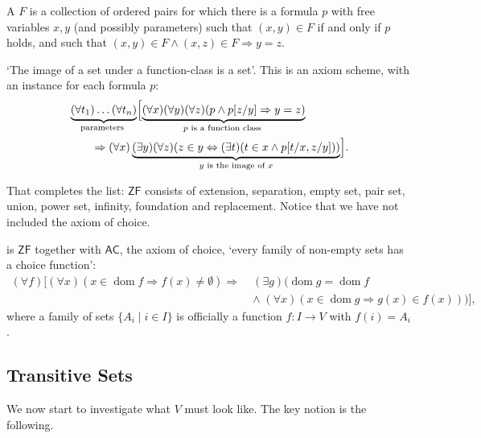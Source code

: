 \documentclass[a4paper]{scrartcl}
\newcommand{\dom}{\operatorname{dom}}
\newcommand{\ZF}{\mathsf{ZF}}
\newcommand{\ZFC}{\mathsf{ZFC}}
\newcommand{\AC}{\mathsf{AC}}
\begin{document}
\begin{definition}
  A  $F$ is a collection of ordered pairs for which there is a formula $p$ with free variables $x, y$ (and possibly parameters) such that $(x, y) \in F$ if and only if $p$ holds, and such that $(x,y) \in F \land (x, z) \in F \Rightarrow y = z$.
\end{definition}

\begin{axiom}[Replacement]
  `The image of a set under a function-class is a set'. This is an axiom scheme, with an instance for each formula $p$:
  \begin{align*}
      & \underbrace{\left(\forall t_1\right) \ldots\left(\forall t_n\right)}_{\text {parameters }}\Bigl[\underbrace{(\forall x)(\forall y)(\forall z)(p \land p[z / y] \Rightarrow y=z)}_{p \text { is a function class }} \\
      & \qquad \Rightarrow (\forall x) \underbrace{(\exists y)(\forall z)(z \in y \Leftrightarrow(\exists t)(t \in x \land p[t / x , z / y]))}_{y \text { is the image of } x}\Bigr].
  \end{align*}
\end{axiom}

That completes the list: $\ZF$ consists of extension, separation, empty set, pair set, union, power set, infinity, foundation and replacement. Notice that we have not included the axiom of choice.

\begin{definition}[ZFC]
  \vocab{$\ZFC$} is $\ZF$ together with $\AC$, the axiom of choice, `every family of non-empty sets has a choice function':
  \begin{align*}
    (\forall f)\bigl[(\forall x)(x \in \dom f \Rightarrow f(x) \neq \emptyset) \Rightarrow \; &(\exists g)\bigl(\dom g = \dom f \\
    &\land \; (\forall x)(x \in \dom g \Rightarrow g(x) \in f(x))\bigr)\bigr],
  \end{align*}
  where a family of sets $\{A_i \mid i \in I\}$ is officially a function $f : I \to V$ with $f(i) = A_i$.
\end{definition}

\subsection{Transitive Sets}

We now start to investigate what $V$ must look like. The key notion is the following.
\end{document}
